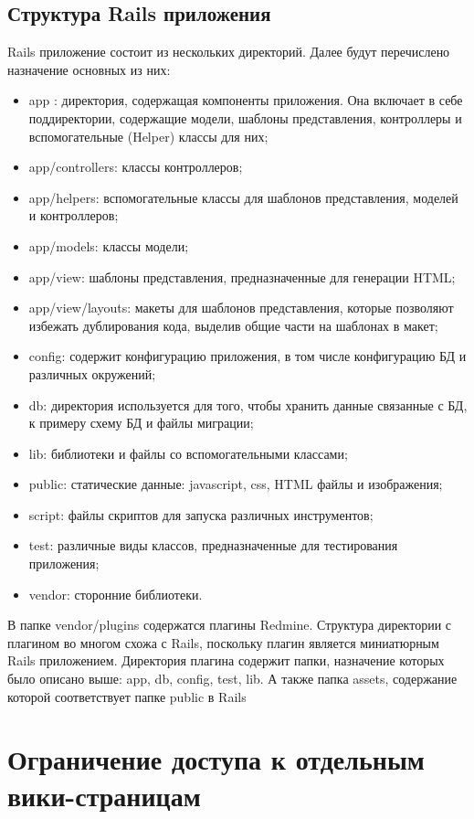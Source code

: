 \subsection{Структура Rails приложения}
Rails приложение состоит из нескольких директорий. Далее будут перечислено
назначение основных из них:
\begin{itemize}
\item app : директория, содержащая компоненты приложения. Она включает в
себе поддиректории, содержащие модели, шаблоны представления, контроллеры и
вспомогательные (Helper) классы для них;
\item app/controllers: классы контроллеров;
\item app/helpers: вспомогательные классы для шаблонов представления, моделей и
контроллеров;
\item app/models: классы модели;
\item app/view: шаблоны представления, предназначенные для генерации HTML;
\item app/view/layouts: макеты для шаблонов представления, которые позволяют
избежать дублирования кода, выделив общие части на шаблонах в макет;
\item config: содержит конфигурацию приложения, в том числе конфигурацию БД
и различных окружений;
\item db: директория используется для того, чтобы хранить данные связанные
с БД, к примеру схему БД и файлы миграции;
\item lib: библиотеки и файлы со вспомогательными классами;
\item public: статические данные: javascript, css, HTML файлы и изображения;
\item script: файлы скриптов для запуска различных инструментов;
\item test: различные виды классов, предназначенные для тестирования
приложения;
\item vendor: сторонние библиотеки.
\end{itemize}
В папке vendor/plugins содержатся плагины Redmine. Структура директории с
плагином во многом схожа с Rails, поскольку плагин является миниатюрным Rails
приложением. Директория плагина содержит папки, назначение которых
было описано выше: app, db, config, test, lib. А также папка assets, содержание
которой соответствует папке public в Rails


\section{Ограничение доступа к отдельным вики-страницам}

